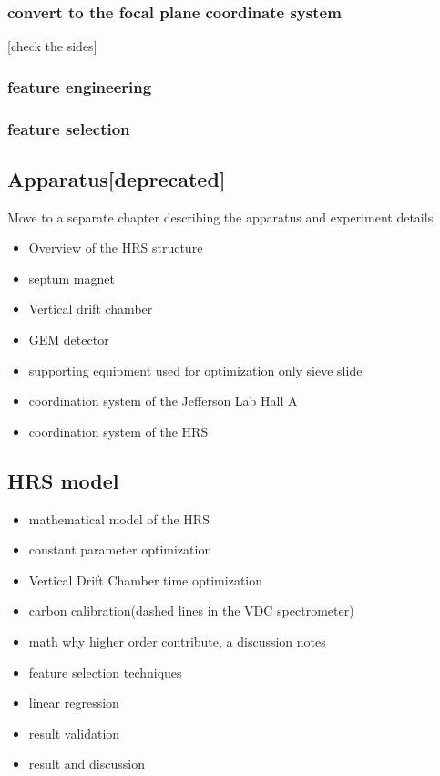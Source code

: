 \subsubsection{convert to the focal plane coordinate system}

[check the sides] 


\subsubsection{feature engineering}
\subsubsection{feature selection}
\subsection{Apparatus[deprecated]}

Move to a separate chapter describing the apparatus and experiment details

\begin{itemize}
    \item Overview of the HRS structure
    \item septum magnet 
    \item Vertical drift chamber 
    \item GEM detector
    \item supporting equipment used for optimization only sieve slide

    \item coordination system of the Jefferson Lab Hall A
    \item coordination system of the HRS
\end{itemize}


\subsection{HRS model}

\begin{itemize}
    \item mathematical model of the HRS
    \item constant parameter optimization
    \item Vertical Drift Chamber time optimization
    \item carbon calibration(dashed lines in the VDC spectrometer)
    \item math why higher order contribute, a discussion notes
    \item feature selection techniques
    \item linear regression
    \item result validation
    \item result and discussion
\end{itemize}

